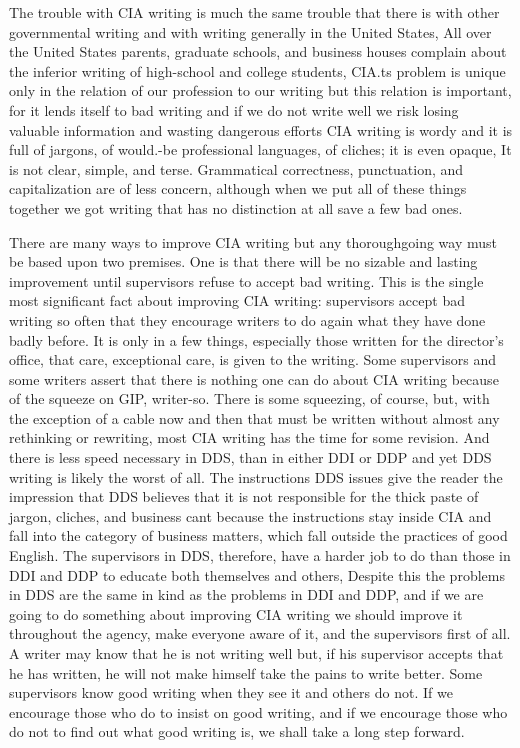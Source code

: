 \documentclass[
    oneside,
    11pt,
]{memoir}
\begin{document}
The trouble with CIA writing is much the same trouble that there is with other governmental writing and with writing generally in the United States, All over the United States parents, graduate schools, and business houses complain about the inferior writing of high-school and college students, CIA.ts problem is unique only in the relation of our profession to our writing but this relation is important, for it lends itself to bad writing and if we do not write well we risk losing valuable information and wasting dangerous efforts CIA writing is wordy and it is full of jargons, of would.-be professional languages, of cliches; it is even opaque, It is not clear, simple, and terse. Grammatical correctness, punctuation, and capitalization are of less concern, although when we put all of these things together we got writing that has no distinction at all save a few bad ones.

There are many ways to improve CIA writing but any thoroughgoing way must be based upon two premises. One is that there will be no sizable and lasting improvement until supervisors refuse to accept bad writing. This is the single most significant fact about improving CIA writing: supervisors accept bad writing so often that they encourage writers to do again what they have done badly before. It is only in a few things, especially those written for the director's office, that care, exceptional care, is given to the writing. Some supervisors and some writers assert that there is nothing one can do about CIA writing because of the squeeze on GIP, writer-so. There is some squeezing, of course, but, with the exception of a cable now and then that must be written without almost any rethinking or rewriting, most CIA writing has the time for some revision. And there is less speed necessary in DDS, than in either DDI or DDP and yet DDS writing is likely the worst of all. The instructions DDS issues give the reader the impression that DDS believes that it is not responsible for the thick paste of jargon, cliches, and business cant because the instructions stay inside CIA and fall into the category of business matters, which fall outside the practices of good English. The supervisors in DDS, therefore, have a harder job to do than those in DDI and DDP to educate both themselves and others, Despite this the problems in DDS are the same in kind as the problems in DDI and DDP, and if we are going to do something about improving CIA writing we should improve it throughout the agency, make everyone aware of it, and the supervisors first of all. A writer may know that he is not writing well but, if his supervisor accepts that he has written, he will not make himself take the pains to write better. Some supervisors know good writing when they see it and others do not. If we encourage those who do to insist on good writing, and if we encourage those who do not to find out what good writing is, we shall take a long step forward. 
\end{document}
